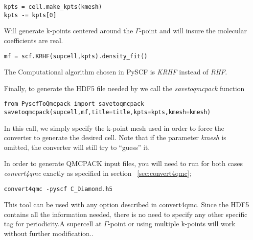 \begin{lstlisting}
kpts = cell.make_kpts(kmesh)
kpts -= kpts[0]
\end{lstlisting}
Will generate k-points centered around the $\Gamma$-point and will insure the molecular coefficients are real.\\

\begin{lstlisting}[style=Python]
mf = scf.KRHF(supcell,kpts).density_fit()
\end{lstlisting}
The Computational algorithm chosen in PySCF is \textit{KRHF} instead of \textit{RHF}.

Finally, to generate the HDF5 file needed by \qmcpack we call the \textit{savetoqmcpack} function\\
\begin{lstlisting}[style=Python]
from PyscfToQmcpack import savetoqmcpack
savetoqmcpack(supcell,mf,title=title,kpts=kpts,kmesh=kmesh)
\end{lstlisting}
In this call, we simply specify the k-point mesh used in order to force the converter to generate the desired cell. Note that if the parameter \textit{kmesh} is omitted, the converter will still try to ``guess'' it.



In order to generate QMCPACK input files, you will need to run for both cases \textit{convert4qmc} exactly as specified in section ~\ref{sec:convert4qmc};
\begin{lstlisting}[style=SHELL]
convert4qmc -pyscf C_Diamond.h5
\end{lstlisting}

This tool can be used with any option described in convert4qmc. Since
the HDF5 contains all the information needed, there is no need to
specify any other specific tag for periodicity.A supercell at
$\Gamma$-point or using multiple k-points will work without further
modification..

